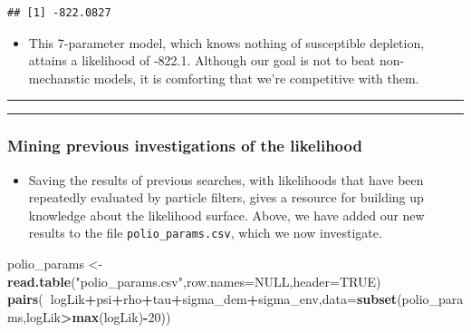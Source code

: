 \documentclass[]{article}
\newenvironment{Shaded}{\begin{snugshade}}{\end{snugshade}}
\newcommand{\KeywordTok}[1]{\textcolor[rgb]{0.13,0.29,0.53}{\textbf{#1}}}
\newcommand{\DataTypeTok}[1]{\textcolor[rgb]{0.13,0.29,0.53}{#1}}
\newcommand{\DecValTok}[1]{\textcolor[rgb]{0.00,0.00,0.81}{#1}}
\newcommand{\StringTok}[1]{\textcolor[rgb]{0.31,0.60,0.02}{#1}}
\newcommand{\OtherTok}[1]{\textcolor[rgb]{0.56,0.35,0.01}{#1}}
\newcommand{\OperatorTok}[1]{\textcolor[rgb]{0.81,0.36,0.00}{\textbf{#1}}}
\newcommand{\NormalTok}[1]{#1}
\providecommand{\tightlist}{%
  \setlength{\itemsep}{0pt}\setlength{\parskip}{0pt}}
\begin{document}
\begin{verbatim}
## [1] -822.0827
\end{verbatim}

\begin{itemize}
\tightlist
\item
  This 7-parameter model, which knows nothing of susceptible depletion,
  attains a likelihood of -822.1. Although our goal is not to beat
  non-mechanstic models, it is comforting that we're competitive with
  them.
\end{itemize}

\begin{center}\rule{0.5\linewidth}{\linethickness}\end{center}

\begin{center}\rule{0.5\linewidth}{\linethickness}\end{center}

\subsubsection{Mining previous investigations of the
likelihood}\label{mining-previous-investigations-of-the-likelihood}

\begin{itemize}
\tightlist
\item
  Saving the results of previous searches, with likelihoods that have
  been repeatedly evaluated by particle filters, gives a resource for
  building up knowledge about the likelihood surface. Above, we have
  added our new results to the file \texttt{polio\_params.csv}, which we
  now investigate.
\end{itemize}

\begin{Shaded}
\begin{Highlighting}[]
\NormalTok{polio_params <-}\StringTok{ }\KeywordTok{read.table}\NormalTok{(}\StringTok{"polio_params.csv"}\NormalTok{,}\DataTypeTok{row.names=}\OtherTok{NULL}\NormalTok{,}\DataTypeTok{header=}\OtherTok{TRUE}\NormalTok{)}
\KeywordTok{pairs}\NormalTok{(}\OperatorTok{~}\NormalTok{logLik}\OperatorTok{+}\NormalTok{psi}\OperatorTok{+}\NormalTok{rho}\OperatorTok{+}\NormalTok{tau}\OperatorTok{+}\NormalTok{sigma_dem}\OperatorTok{+}\NormalTok{sigma_env,}\DataTypeTok{data=}\KeywordTok{subset}\NormalTok{(polio_params,logLik}\OperatorTok{>}\KeywordTok{max}\NormalTok{(logLik)}\OperatorTok{-}\DecValTok{20}\NormalTok{))}
\end{Highlighting}
\end{Shaded}
\end{document}
